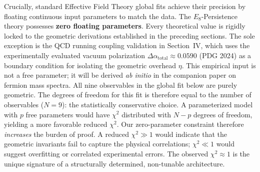 Crucially, standard Effective Field Theory global fits achieve their precision by floating continuous input parameters to match the data. The $E_8$-Persistence theory possesses \textbf{zero floating parameters}. Every theoretical value is rigidly locked to the geometric derivations established in the preceding sections. The sole exception is the QCD running coupling validation in Section~IV, which uses the experimentally evaluated vacuum polarization $\Delta\alpha_{\text{total}} \approx 0.0590$ (PDG 2024) as a boundary condition for isolating the geometric overhead $\eta$. This empirical input is not a free parameter; it will be derived \textit{ab initio} in the companion paper on fermion mass spectra. All nine observables in the global fit below are purely geometric. The degrees of freedom for this fit is therefore equal to the number of observables ($N=9$): the statistically conservative choice. A parameterized model with $p$ free parameters would have $\chi^2$ distributed with $N-p$ degrees of freedom, yielding a more favorable reduced $\chi^2$. Our zero-parameter constraint therefore \emph{increases} the burden of proof. A reduced $\chi^2 \gg 1$ would indicate that the geometric invariants fail to capture the physical correlations; $\chi^2 \ll 1$ would suggest overfitting or correlated experimental errors. The observed $\chi^2 \approx 1$ is the unique signature of a structurally determined, non-tunable architecture.

